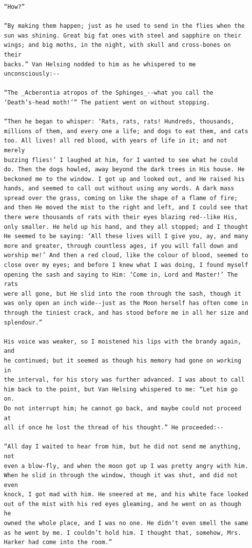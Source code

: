 \documentclass{article}
\begin{document}
\begin{verbatim}
“How?”

“By making them happen; just as he used to send in the flies when the
sun was shining. Great big fat ones with steel and sapphire on their
wings; and big moths, in the night, with skull and cross-bones on their
backs.” Van Helsing nodded to him as he whispered to me unconsciously:--

“The _Acberontia atropos of the Sphinges_--what you call the
‘Death’s-head moth!’” The patient went on without stopping.

“Then he began to whisper: ‘Rats, rats, rats! Hundreds, thousands,
millions of them, and every one a life; and dogs to eat them, and cats
too. All lives! all red blood, with years of life in it; and not merely
buzzing flies!’ I laughed at him, for I wanted to see what he could
do. Then the dogs howled, away beyond the dark trees in His house. He
beckoned me to the window. I got up and looked out, and He raised his
hands, and seemed to call out without using any words. A dark mass
spread over the grass, coming on like the shape of a flame of fire;
and then He moved the mist to the right and left, and I could see that
there were thousands of rats with their eyes blazing red--like His,
only smaller. He held up his hand, and they all stopped; and I thought
He seemed to be saying: ‘All these lives will I give you, ay, and many
more and greater, through countless ages, if you will fall down and
worship me!’ And then a red cloud, like the colour of blood, seemed to
close over my eyes; and before I knew what I was doing, I found myself
opening the sash and saying to Him: ‘Come in, Lord and Master!’ The rats
were all gone, but He slid into the room through the sash, though it
was only open an inch wide--just as the Moon herself has often come in
through the tiniest crack, and has stood before me in all her size and
splendour.”

His voice was weaker, so I moistened his lips with the brandy again, and
he continued; but it seemed as though his memory had gone on working in
the interval, for his story was further advanced. I was about to call
him back to the point, but Van Helsing whispered to me: “Let him go on.
Do not interrupt him; he cannot go back, and maybe could not proceed at
all if once he lost the thread of his thought.” He proceeded:--

“All day I waited to hear from him, but he did not send me anything, not
even a blow-fly, and when the moon got up I was pretty angry with him.
When he slid in through the window, though it was shut, and did not even
knock, I got mad with him. He sneered at me, and his white face looked
out of the mist with his red eyes gleaming, and he went on as though he
owned the whole place, and I was no one. He didn’t even smell the same
as he went by me. I couldn’t hold him. I thought that, somehow, Mrs.
Harker had come into the room.”


\end{verbatim}
\end{document}

